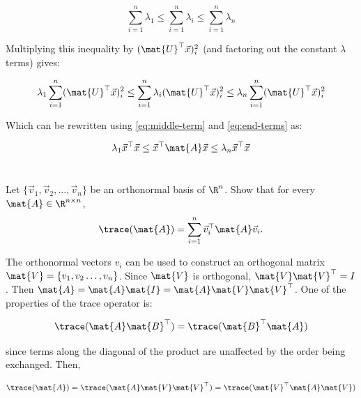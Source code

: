 \documentclass{template}
\begin{document}
\begin{equation}
    \sum_{i=1}^n \lambda_1 \leq \sum_{i=1}^n \lambda_i \leq \sum_{i=1}^n \lambda_n
\end{equation}

Multiplying this inequality by $(\mat{U}^\top\vec{x})_i^2$ (and factoring out the constant $\lambda$ terms) gives:

\begin{equation}
     \lambda_1 \sum_{i=1}^n(\mat{U}^\top\vec{x})_i^2\leq \sum_{i=1}^n \lambda_i(\mat{U}^\top\vec{x})_i^2 \leq\lambda_n \sum_{i=1}^n (\mat{U}^\top\vec{x})_i^2
\end{equation}

Which can be rewritten using \autoref{eq:middle-term} and \autoref{eq:end-terms} as:

\begin{equation}
    \lambda_1 \vec{x}^\top \vec{x} \leq \vec{x}^\top \mat{A} \vec{x} \leq  \lambda_n \vec{x}^\top \vec{x}
\end{equation}


\newpage
\section{}

\subsection{}
Let $\{\vec{v}_1, \vec{v}_2, \ldots, \vec{v}_n\}$ be an orthonormal basis of $\R^n$. 
Show that for every $\mat{A} \in \R^{n \times n}$, 
\[
\trace(\mat{A}) = \sum_{i = 1}^n \vec{v}_i^\top \mat{A} \vec{v}_i.
\] 

The orthonormal vectors $v_i$ can be used to construct an orthogonal matrix $\mat{V} = \{v_1, v_2\dots, v_n \}$. Since $\mat{V}$ is orthogonal, $\mat{V}\mat{V}^\top = I$. Then $\mat{A} = \mat{A}\mat{I} = \mat{A}\mat{V}\mat{V}^\top$. One of the properties of the trace operator is:

\begin{equation}
    \trace (\mat{A}\mat{B}^\top) = \trace (\mat{B}^\top\mat{A})
\end{equation}

since terms along the diagonal of the product are unaffected by the order being exchanged. Then,

\begin{equation}
    \trace (\mat{A}) = \trace (\mat{A}\mat{V}\mat{V}^\top) = \trace (\mat{V}^\top\mat{A}\mat{V}) 
\end{equation}
\end{document}
